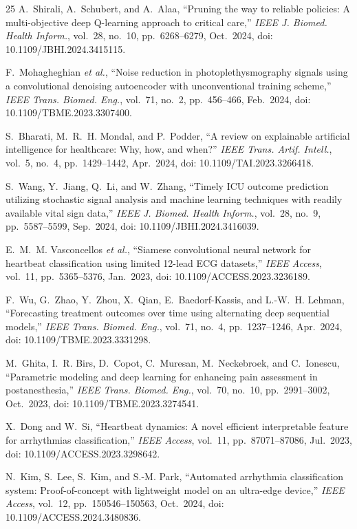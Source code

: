 \documentclass[conference]{IEEEtran}
\begin{document}
\begin{thebibliography}{25}
A.~Shirali, A.~Schubert, and A.~Alaa, ``Pruning the way to reliable policies: A multi-objective deep Q-learning approach to critical care,'' \textit{IEEE J. Biomed. Health Inform.}, vol.~28, no.~10, pp.~6268--6279, Oct.~2024, doi: 10.1109/JBHI.2024.3415115.

F.~Mohagheghian \textit{et al.}, ``Noise reduction in photoplethysmography signals using a convolutional denoising autoencoder with unconventional training scheme,'' \textit{IEEE Trans. Biomed. Eng.}, vol.~71, no.~2, pp.~456--466, Feb.~2024, doi: 10.1109/TBME.2023.3307400.

S.~Bharati, M.~R.~H. Mondal, and P.~Podder, ``A review on explainable artificial intelligence for healthcare: Why, how, and when?'' \textit{IEEE Trans. Artif. Intell.}, vol.~5, no.~4, pp.~1429--1442, Apr.~2024, doi: 10.1109/TAI.2023.3266418.

S.~Wang, Y.~Jiang, Q.~Li, and W.~Zhang, ``Timely ICU outcome prediction utilizing stochastic signal analysis and machine learning techniques with readily available vital sign data,'' \textit{IEEE J. Biomed. Health Inform.}, vol.~28, no.~9, pp.~5587--5599, Sep.~2024, doi: 10.1109/JBHI.2024.3416039.

E.~M.~M. Vasconcellos \textit{et al.}, ``Siamese convolutional neural network for heartbeat classification using limited 12-lead ECG datasets,'' \textit{IEEE Access}, vol.~11, pp.~5365--5376, Jan.~2023, doi: 10.1109/ACCESS.2023.3236189.

F.~Wu, G.~Zhao, Y.~Zhou, X.~Qian, E.~Baedorf-Kassis, and L.-W.~H. Lehman, ``Forecasting treatment outcomes over time using alternating deep sequential models,'' \textit{IEEE Trans. Biomed. Eng.}, vol.~71, no.~4, pp.~1237--1246, Apr.~2024, doi: 10.1109/TBME.2023.3331298.

M.~Ghita, I.~R. Birs, D.~Copot, C.~Muresan, M.~Neckebroek, and C.~Ionescu, ``Parametric modeling and deep learning for enhancing pain assessment in postanesthesia,'' \textit{IEEE Trans. Biomed. Eng.}, vol.~70, no.~10, pp.~2991--3002, Oct.~2023, doi: 10.1109/TBME.2023.3274541.

X.~Dong and W.~Si, ``Heartbeat dynamics: A novel efficient interpretable feature for arrhythmias classification,'' \textit{IEEE Access}, vol.~11, pp.~87071--87086, Jul.~2023, doi: 10.1109/ACCESS.2023.3298642.

N.~Kim, S.~Lee, S.~Kim, and S.-M. Park, ``Automated arrhythmia classification system: Proof-of-concept with lightweight model on an ultra-edge device,'' \textit{IEEE Access}, vol.~12, pp.~150546--150563, Oct.~2024, doi: 10.1109/ACCESS.2024.3480836.


\end{thebibliography}
\end{document}
